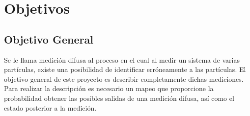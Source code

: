
\chapter*{Objetivos} 

\section*{Objetivo General}


Se le llama medición difusa al proceso en el cual al medir un sistema de varias
partículas, existe una posibilidad de identificar erróneamente a las
partículas. El objetivo general de este proyecto es describir completamente
dichas mediciones. Para realizar la descripción es necesario un mapeo que
proporcione la probabilidad obtener las posibles salidas de una medición
difusa, así como el estado posterior a la medición.   


